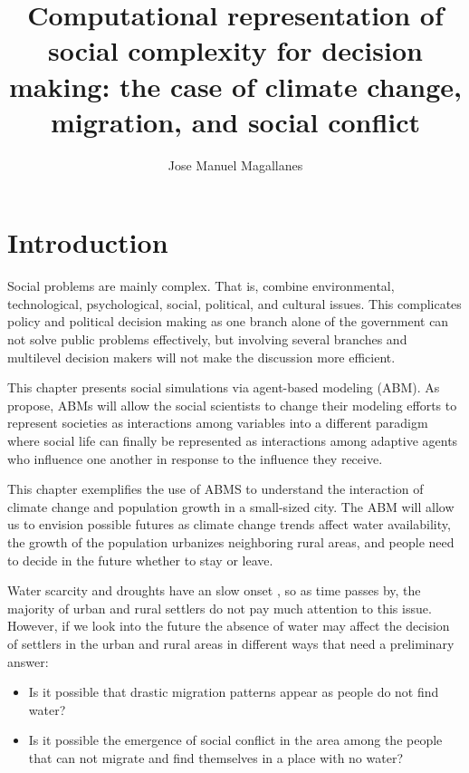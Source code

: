 \documentclass[doc,12pt,floatsintext]{apa7}
\title{Computational representation of social complexity for decision making: the case of climate change, migration, and social conflict}
\author{Jose Manuel Magallanes}
\begin{document}

\maketitle %

\section{Introduction} 

Social problems are mainly complex. That is, combine environmental, technological, psychological, social, political, and cultural issues. This complicates policy  and political decision making as one branch alone of the government can not solve public problems effectively, but involving several branches and multilevel decision makers will not make the discussion more efficient. 

This chapter presents social simulations via agent-based modeling (ABM). As \textcite{macy_factors_2002} propose, ABMs will allow the social scientists to change their  modeling efforts to represent societies as interactions among variables into a different paradigm where social life can finally be represented as interactions among adaptive agents who influence one another in response to the influence they receive.

This chapter exemplifies the use of ABMS to understand the interaction of climate change and population growth in a small-sized city. The ABM will allow us to envision possible futures as climate change trends affect water availability, the growth of the population urbanizes neighboring rural areas, and people need to decide in the future whether to stay or leave. 

Water scarcity and droughts have an slow onset \parencite{singh_losses_2021}, so as time passes by, the majority of urban and rural settlers do not pay much attention to this issue. However, if we look into the future the absence of water may affect the decision of settlers in the urban and rural areas in different ways that need a preliminary answer:

\begin{itemize}
\item Is it possible that drastic migration patterns appear as people do not find water?
\item Is it possible the emergence of social conflict in the area among the people that can not migrate and find themselves in a place with no water?
\end{itemize}
\end{document}
